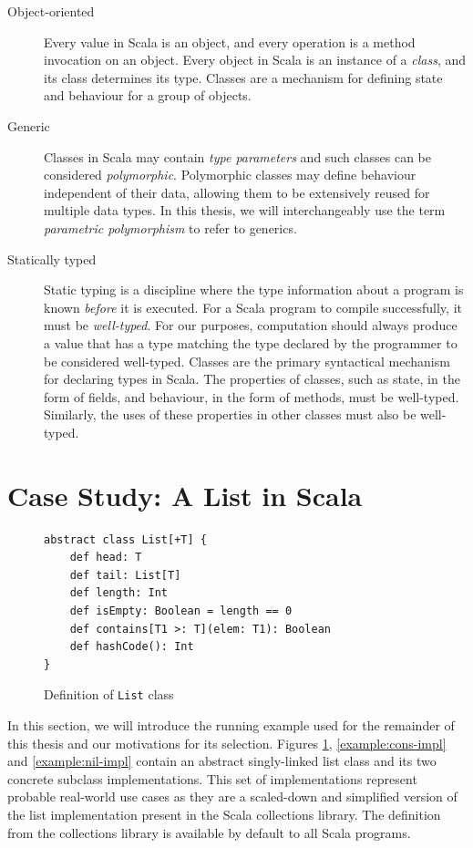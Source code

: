 \begin{description}
	\item[Object-oriented] 
	Every value in Scala is an object, and every operation is a method invocation on an object. 
	Every object in Scala is an instance of a \textit{class}, and its class determines its type.
	Classes\cite{simula:classes} are a mechanism for defining state and behaviour for a group of objects.	
	
	\item[Generic] 
	Classes in Scala may contain \textit{type parameters} and such classes can be considered \textit{polymorphic}\cite{strachey:fundamental-concepts}.
	Polymorphic classes may define behaviour independent of their data, allowing them to be extensively reused for multiple data types.
	In this thesis, we will interchangeably use the term \textit{parametric polymorphism} to refer to generics.
	
	\item[Statically typed] 
	Static typing is a discipline where the type information about a program is known \textit{before} it is executed.
	For a Scala program to compile successfully, it must be \textit{well-typed}.
	For our purposes, computation should always produce a value that has a type matching the type declared by the programmer to be considered well-typed.
	Classes are the primary syntactical mechanism for declaring types in Scala. 
	The properties of classes, such as state, in the form of fields, and behaviour, in the form of methods, must be well-typed.
	Similarly, the uses of these properties in other classes must also be well-typed. 
\end{description}

\section{Case Study: A List in Scala}

\begin{figure}[!htb]
\begin{verbatim}
abstract class List[+T] {
	def head: T
	def tail: List[T]
	def length: Int
	def isEmpty: Boolean = length == 0
	def contains[T1 >: T](elem: T1): Boolean
    def hashCode(): Int 
}
\end{verbatim}
\caption{Definition of \texttt{List} class}
\label{example:list-def}
\end{figure}

In this section, we will introduce the running example used for the remainder of this thesis and our motivations for its selection.
Figures \ref{example:list-def}, \ref{example:cons-impl} and \ref{example:nil-impl} contain an abstract singly-linked list class and its two concrete subclass implementations. 
This set of  implementations represent probable real-world use cases as they are a scaled-down and simplified version of the list implementation present in the Scala collections library.
The  definition from the collections library is available by default to all Scala programs.


